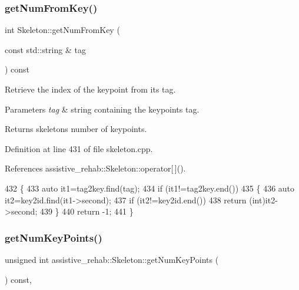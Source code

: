 \subsubsection{\texorpdfstring{get\+Num\+From\+Key()}{getNumFromKey()}}
{\footnotesize\ttfamily int Skeleton\+::get\+Num\+From\+Key (\begin{DoxyParamCaption}\item[{const std\+::string \&}]{tag }\end{DoxyParamCaption}) const\hspace{0.3cm}{\ttfamily [inherited]}}



Retrieve the index of the keypoint from its tag. 


\begin{DoxyParams}{Parameters}
{\em tag} & string containing the keypoint\textquotesingle{}s tag. \\
\hline
\end{DoxyParams}
\begin{DoxyReturn}{Returns}
skeleton\textquotesingle{}s number of keypoints. 
\end{DoxyReturn}


Definition at line 431 of file skeleton.\+cpp.



References assistive\+\_\+rehab\+::\+Skeleton\+::operator\mbox{[}$\,$\mbox{]}().


\begin{DoxyCode}
432 \{
433     \textcolor{keyword}{auto} it1=tag2key.find(tag);
434     \textcolor{keywordflow}{if} (it1!=tag2key.end())
435     \{
436         \textcolor{keyword}{auto} it2=key2id.find(it1->second);
437         \textcolor{keywordflow}{if} (it2!=key2id.end())
438             \textcolor{keywordflow}{return} (\textcolor{keywordtype}{int})it2->second;
439     \}
440     \textcolor{keywordflow}{return} -1;
441 \}
\end{DoxyCode}
\mbox{\label{classassistive__rehab_1_1Skeleton_ac5e5b98f2c9178f6e0def5033e27922f}} 
\subsubsection{\texorpdfstring{get\+Num\+Key\+Points()}{getNumKeyPoints()}}
{\footnotesize\ttfamily unsigned int assistive\+\_\+rehab\+::\+Skeleton\+::get\+Num\+Key\+Points (\begin{DoxyParamCaption}{ }\end{DoxyParamCaption}) const\hspace{0.3cm}{\ttfamily [inline]}, {\ttfamily [inherited]}}




